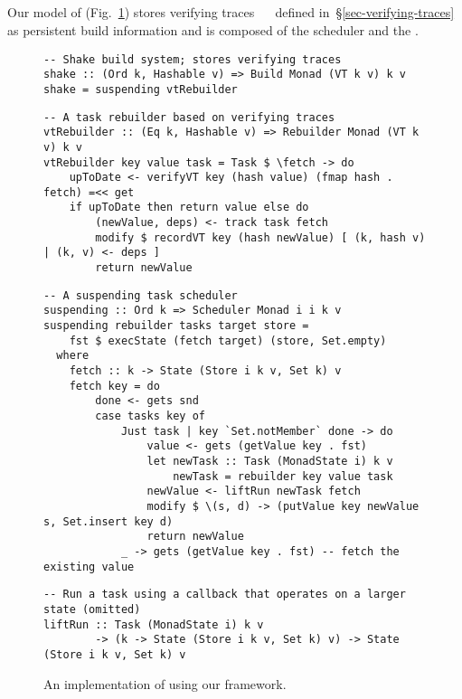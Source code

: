\subsection{\Shake}\label{sec-implementation-shake}

Our model of \Shake (Fig.~\ref{fig-shake-implementation}) stores verifying
traces ~~ defined in~\S\ref{sec-verifying-traces} as
persistent build information and is composed of the  scheduler
and the .

\begin{figure}
\begin{verbatim}
-- Shake build system; stores verifying traces
shake :: (Ord k, Hashable v) => Build Monad (VT k v) k v
shake = suspending vtRebuilder
\end{verbatim}
\vspace{1mm}
\begin{verbatim}
-- A task rebuilder based on verifying traces
vtRebuilder :: (Eq k, Hashable v) => Rebuilder Monad (VT k v) k v
vtRebuilder key value task = Task $ \fetch -> do
    upToDate <- verifyVT key (hash value) (fmap hash . fetch) =<< get
    if upToDate then return value else do
        (newValue, deps) <- track task fetch
        modify $ recordVT key (hash newValue) [ (k, hash v) | (k, v) <- deps ]
        return newValue
\end{verbatim}
\vspace{1mm}
\begin{verbatim}
-- A suspending task scheduler
suspending :: Ord k => Scheduler Monad i i k v
suspending rebuilder tasks target store =
    fst $ execState (fetch target) (store, Set.empty)
  where
    fetch :: k -> State (Store i k v, Set k) v
    fetch key = do
        done <- gets snd
        case tasks key of
            Just task | key `Set.notMember` done -> do
                value <- gets (getValue key . fst)
                let newTask :: Task (MonadState i) k v
                    newTask = rebuilder key value task
                newValue <- liftRun newTask fetch
                modify $ \(s, d) -> (putValue key newValue s, Set.insert key d)
                return newValue
            _ -> gets (getValue key . fst) -- fetch the existing value
\end{verbatim}
\vspace{1mm}
\begin{verbatim}
-- Run a task using a callback that operates on a larger state (omitted)
liftRun :: Task (MonadState i) k v
        -> (k -> State (Store i k v, Set k) v) -> State (Store i k v, Set k) v
\end{verbatim}
\caption{An implementation of \Shake using our framework.}\label{fig-shake-implementation}
\end{figure}

